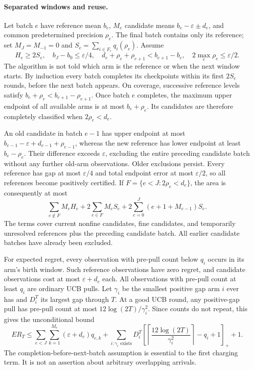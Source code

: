 \paragraph{Separated windows and reuse.}
Let batch $e$ have reference mean $b_e$, $M_e$ candidate means
$b_e-\varepsilon\pm d_e$, and common predetermined precision $\rho_e$.
The final batch contains only its reference; set $M_J=M_{-1}=0$ and
$S_e=\sum_{i\in F_e}q_i(\rho_e)$. Assume
\[
 H_e\ge2S_e,\quad b_J-b_0\le\varepsilon/4,\quad
 d_e+\rho_e+\rho_{e+1}<b_{e+1}-b_e,\quad
 2\max_e\rho_e\le\varepsilon/2.
\]
The algorithm is not told which arm is the reference or when the next window
starts. By induction every batch completes its checkpoints within its first
$2S_e$ rounds, before the next batch appears. On coverage, successive
reference levels satisfy $b_e+\rho_e<b_{e+1}-\rho_{e+1}$. Once batch $e$
completes, the maximum upper endpoint of all available arms is at most
$b_e+\rho_e$. Its candidates are therefore completely classified when
$2\rho_e<d_e$.

An old candidate in batch $e-1$ has upper endpoint at most
$b_{e-1}-\varepsilon+d_{e-1}+\rho_{e-1}$, whereas the new reference has
lower endpoint at least $b_e-\rho_e$. Their difference exceeds
$\varepsilon$, excluding the entire preceding candidate batch without any
further old-arm observations. Older exclusions persist. Every reference has
gap at most $\varepsilon/4$ and total endpoint error at most
$\varepsilon/2$, so all references become positively certified.
If $F=\{e<J:2\rho_e<d_e\}$, the area is consequently at most
\[
 \sum_{e\notin F}M_eH_e+2\sum_{e\in F}M_eS_e+
                2\sum_{e=0}^J(e+1+M_{e-1})S_e.
\]
The terms cover current nonfine candidates, fine candidates, and temporarily
unresolved references plus the preceding candidate batch. All earlier
candidate batches have already been excluded.

For expected regret, every observation with pre-pull count below $q_i$
occurs in its arm's birth window. Such reference observations have zero
regret, and candidate observations cost at most $\varepsilon+d_e$ each.
All observations with pre-pull count at least $q_i$ are ordinary UCB pulls.
Let $\gamma_i$ be the smallest positive gap arm $i$ ever has and
$D_i^T$ its largest gap through $T$. At a good UCB round, any positive-gap
pull has pre-pull count at most $12\log(2T)/\gamma_i^2$. Since counts do not
repeat, this gives the unconditional bound
\[
 ER_T\le\sum_{e<J}\sum_{k=1}^{M_e}(\varepsilon+d_e)q_{e,k}
 +\sum_{i:\gamma_i\text{ exists}}D_i^T
 \left[\left\lceil\frac{12\log(2T)}{\gamma_i^2}\right\rceil-q_i+1\right]_+
 +1.
\]
The completion-before-next-batch assumption is essential to the first
charging term. It is not an assertion about arbitrary overlapping arrivals.


